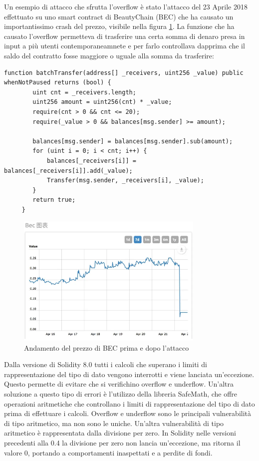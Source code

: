 \documentclass[../../Thesis.tex]{subfiles}
\begin{document}
Un esempio di attacco che sfrutta l'overflow è stato l'attacco del 23 Aprile 2018 effettuato su uno smart contract di BeautyChain (BEC) che ha causato un importantissimo crash del prezzo, visibile nella figura \ref{fig:BECPrice}. La funzione che ha causato l'overflow permetteva di trasferire una certa somma di denaro presa in input a più utenti contemporaneamnete e per farlo controllava dapprima che il saldo del contratto fosse maggiore o uguale alla somma da trasferire:
\begin{lstlisting}[language=Solidity]
    function batchTransfer(address[] _receivers, uint256 _value) public whenNotPaused returns (bool) {
        uint cnt = _receivers.length;
        uint256 amount = uint256(cnt) * _value;
        require(cnt > 0 && cnt <= 20);
        require(_value > 0 && balances[msg.sender] >= amount);
    
        balances[msg.sender] = balances[msg.sender].sub(amount);
        for (uint i = 0; i < cnt; i++) {
            balances[_receivers[i]] = balances[_receivers[i]].add(_value);
            Transfer(msg.sender, _receivers[i], _value);
        }
        return true;
     }
\end{lstlisting}

\begin{figure}[h]
    \centering
    \includegraphics[width=0.8\textwidth]{../../img/BECPrice.png}
    \caption{Andamento del prezzo di BEC prima e dopo  l'attacco}
    \label{fig:BECPrice}
\end{figure}
Dalla versione di Solidity 8.0  tutti i calcoli che superano i limiti di rappresentazione del tipo di dato vengono interrotti e viene lanciata un'eccezione. Questo permette di evitare che si verifichino overflow e underflow. Un'altra soluzione a questo tipo di errori è l'utilizzo della libreria SafeMath, che offre operazioni aritmetiche che controllano i limiti di rappresentazione del tipo di dato prima di effettuare i calcoli. Overflow e underflow sono le principali vulnerabilità di tipo aritmetico, ma non sono le uniche. Un'altra vulnerabilità di tipo aritmetico è rappresentata dalla divisione per zero. In Solidity nelle versioni precedenti alla 0.4 la divisione per zero non lancia un'eccezione, ma ritorna il valore 0, portando a comportamenti inaspettati e a perdite di fondi.
\\
\\
\\
\end{document}
